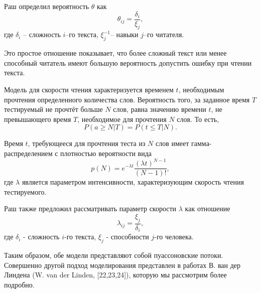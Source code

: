 \documentclass[14pt, a4paper]{extarticle}
\numberwithin{equation}{section}
\begin{document}
{Раш определил вероятность $\theta$ как
\begin{equation}
\theta_{ij}=\frac{\delta_i}{\xi_j},
\end{equation}
где $\delta_i$ – сложность $i$–го текста, $\xi_j^{-1}$– навыки $j$–го читателя.

Это простое отношение показывает, что более сложный текст или менее способный читатель имеют большую вероятность допустить ошибку при чтении текста.

Модель для скорости чтения характеризуется временем $t$, необходимым прочтения определенного количества слов. Вероятность того, за заданное время $T$ тестируемый не прочтёт больше $N$ слов, равна значению времени $t$, не превышающего время $T$, необходимое для прочтения $N$ слов. То есть,
\begin{equation}
P(a\geqslant N|T)=P(t\leqslant T|N).
\end{equation}

Время $t$, требующееся для прочтения теста из $N$ слов имеет гамма-распределением с плотностью вероятности вида
\begin{equation}
p(N)=e^{-\lambda t}\frac{(\lambda t)^{N-1}}{(N-1)!},
\end{equation}
где $\lambda$ является параметром интенсивности, характеризующим скорость чтения тестируемого.

Раш также предложил рассматривать параметр скорости $\lambda$ как отношение
\begin{equation}
\lambda_{ij}=\frac{\xi_j}{\delta_i},
\end{equation}
где $\delta_i$ - сложность $i$-го текста, $\xi_j$ - способности $j$-го человека.

Таким образом, обе модели представляют собой пуассоновские потоки.
Совершенно другой подход моделирования представлен в работах В. ван дер Линдена (W. van der Linden, [22,23,24]), которую мы рассмотрим более подробно.
}
\end{document}
